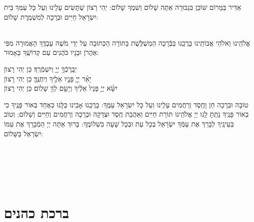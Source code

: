 \documentclass[twoside, openany, parskip=half, 11pt]{book}
\begin{document}
\begin{sometimes}
\begin{paracol}{2}
\switchcolumn

\kahal
אַדִּיר בַּמָּרוֹם שׁוֹכֵן בִּגְבוּרָה אַתָּה שָׁלוֹם וְשִׁמְךָ שָׁלוֹם: יְהִי רָצוֹן שֶׁתָּשִׂים עָלֵֽינוּ וְעַל כָּל עַמְּךָ בֵּית יִשְׂרָאֵל חַיִּים וּבְרָכָה לְמִשְׁמֶֽרֶת שָׁלוֹם:
\end{paracol}

\sepline

\\
 אֱלֹהֵֽינוּ וֵאלֹהֵי אֲבוֹתֵֽינוּ בָּרֲכֵֽנוּ בַּבְּֿרָכָה הַמְשֻׁלֶּֽשֶׁת בַּתּוֹרָה 
הַכְּתוּבָה עַל יְדֵי מֹשֶׁה עַבְדֶּֽךָ הָאֲמוּרָה מִפִּי אַהֲרֹן וּבָנָיו כֹּהֲנִים עַם קְדוֹשֶֽׁךָ כָּאָמוּר: 

	יְבָֽרֶכְֿךָ֥ יְיָ֖ 	וְיִשְׁמְֿרֶֽךָ׃ \hfill \kahal כֵּן יְהִי רָצוׂן \\
	יָאֵ֨ר יְיָ֧ פָּנָ֛יו אֵלֶ֖יךָ וִֽיחֻנֶּֽךָּ׃ \hfill \kahal כֵּן יְהִי רָצוׂן \\
 יִשָּׂ֨א יְיָ֤ פָּנָיו֙ אֵלֶ֔יךָ וְיָשֵׂ֥ם לְךָ֖ שָׁלֽוֹם׃ \hfill \kahal כֵּן יְהִי רָצוׂן

\end{sometimes}


 טוֹבָה וּבְרָכָה חֵן וָחֶֽסֶד וְרַחֲמִים עָלֵֽינוּ וְעַל כָּל יִשְׂרָאֵל עַמֶּֽךָ: בָּרֲכֵֽנוּ אָבִֽינוּ כֻּלָּֽנוּ כְּאֶחָד בְּאוֹר פָּנֶֽיךָ כִּי בְאוֹר פָּנֶֽיךָ נָתַֽתָּ לָֽנוּ יְיָ אֱלֹהֵֽינוּ תּוֹרַת חַיִּים וְאַהֲבַת חֶֽסֶד וּצְדָקָה וּבְרָכָה וְרַחֲמִים וְחַיִּים וְשָׁלוֹם: וְטוֹב בְּעֵינֶֽיךָ לְבָרֵךְ אֶת עַמְּֿךָ יִשְׂרָאֵל בְּכָל עֵת וּבְכָל שָׁעָה בִּשְׁלוֹמֶֽךָ: בָּרוּךְ אַתָּה יְיָ הַמְֿבָרֵךְ אֶת עַמּוֹ יִשְׂרָאֵל בַּשָּׁלוֹם:

\tachanunim

\vfill

  \pageref{tefilasgeshem}\\
 \pageref{tefilastal}\\
  \pageref{hoshanos}\\
 \pageref{einkelokeinu}\\
 \pageref{end of shacharis}


\sepline

\clearpage

\vspace{-1\baselineskip}
\section[ברכת כהנים]{ ברכת כהנים ‎}
\label{birkaskohanim}
\end{document}
